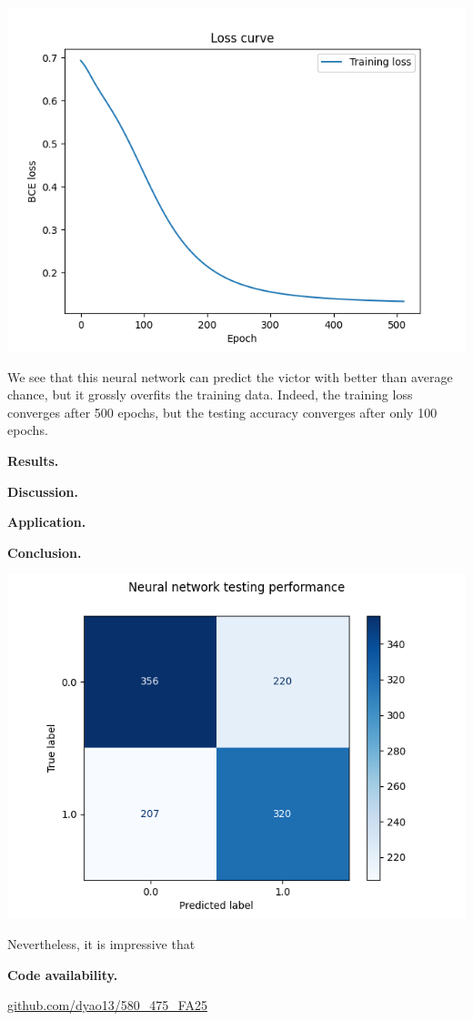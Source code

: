 \documentclass[12pt]{article}
\begin{document}
\begin{center} \includegraphics{"../output/nn_loss_curve.png"} \end{center}

We see that this neural network can predict the victor with better than average chance, but it grossly overfits the training data. Indeed, the training loss converges after 500 epochs, but the testing accuracy converges after only 100 epochs.

\textbf{Results.}

\textbf{Discussion.}

\textbf{Application.}

\textbf{Conclusion.}

\begin{center} \includegraphics{"../output/nn_testing_confusion_matrix.png"} \end{center}

Nevertheless, it is impressive that 

\textbf{Code availability.}

\href{https://github.com/dyao13/580_475_FA25}{github.com/dyao13/580\_475\_FA25}
\end{document}

